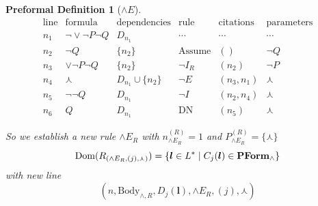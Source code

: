 \documentclass[oneside, 12pt]{book}
\theoremstyle{break}
\newtheorem{preformal definition}[definition]{Preformal Definition}
\newtheorem{preformal theorem}[theorem]{Preformal Theorem}
\newcommand{\bv}[1]{\boldsymbol{#1}}
\begin{document}
\begin{preformal definition}[$\land E$]
			\begin{equation*}
				\begin{array}{c|c|c|c|c|c}
					\text{line} & \text{formula} & \text{dependencies} & \text{rule} & \text{citations} & \text{parameters}\\ \hline			
					n_1 & \lnot \lor \lnot P \lnot Q & D_{n_1} & \cdots & \cdots & \cdots\\
					n_2 & \lnot Q & \{n_2\} & \text{Assume} & () & \lnot Q\\
					n_3 & \lor \lnot P \lnot Q & \{n_2\} & \lnot I_R & (n_2) & \lnot P\\ 
					n_4 & \curlywedge & D_{n_1} \cup \{n_2\} & \lnot E & (n_3, n_1) & \curlywedge\\
					n_5 & \lnot \lnot Q & D_{n_1} & \lnot I & (n_2, n_4) & \curlywedge\\
					n_6 & Q & D_{n_1} & \text{DN} & (n_5) & \curlywedge
				\end{array}
			\end{equation*}			
			
			So we establish a new rule $\land E_R$ with $n_{\land E_R}^{(R)} = 1$ and $P_{\land E_R}^{(R)} = \{\curlywedge\}$
			\begin{equation*}
				\text{Dom}(R_{(\land E_R, (j), \curlywedge)}) = \{\bv{l} \in L^* \mid  C_j(\bv{l}) \in \textbf{PForm}_{\land}\}\\
			\end{equation*}
			with new line
			\begin{equation*}
				(n, \text{Body}_{\land, R}, D_j(\bv{l}), \land E_R, (j), \curlywedge)
			\end{equation*}			
			
		\end{preformal definition}
		
\end{document}
